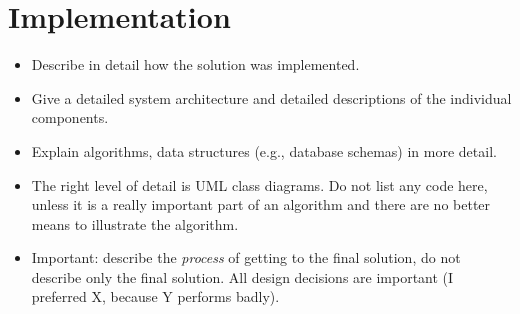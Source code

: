 \chapter{Implementation}
\label{cha:impl}

\begin{itemize}
\item Describe in detail how the solution was implemented.
\item Give a detailed system architecture and detailed descriptions of the
      individual components.
\item Explain algorithms, data structures (e.g., database schemas) in more detail.
\item The right level of detail is UML class diagrams. Do not list any code here,
      unless it is a really important part of an algorithm and there are no better
      means to illustrate the algorithm.
\item Important: describe the \emph{process} of getting to the final solution, do
      not describe only the final solution. All design decisions are important (I preferred
      X, because Y performs badly).
\end{itemize}
